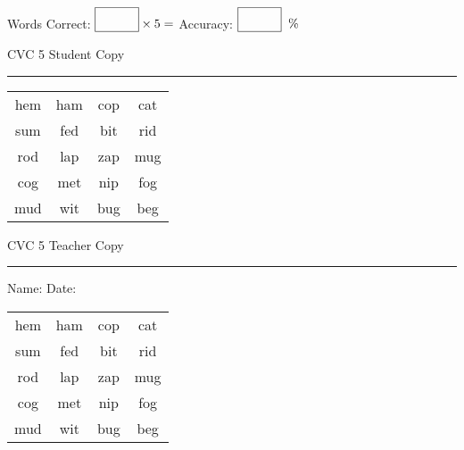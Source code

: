\documentclass{memoir}
\begin{document}
\small

Words Correct: $\fbox{\phantom{\huge 100}} \times 5 = $ Accuracy: $\fbox{\phantom{\huge 100}}\;\; \%$ 

\vfill

\newpage


\footnotesize \noindent
CVC 5 \hfill Student Copy
\smallskip
\hrule

\Large

\setlength{\tabcolsep}{14pt}
\def\arraystretch{2}

{\selectfont


\begin{vplace}[0.5]
\begin{center}
\begin{tabular}{cccc}
hem & ham & cop & cat \\
sum & fed & bit & rid \\
rod & lap & zap & mug \\
cog & met & nip & fog \\
mud & wit & bug & beg \\
\end{tabular}
\end{center}
\end{vplace}

}

\newpage

\footnotesize \noindent
CVC 5 \hfill Teacher Copy
\smallskip
\hrule

\small

\vfill

\noindent
Name: \underline{\hspace{1.75in}} \hfill Date: \underline{\hspace{1in}}

\Large

{\selectfont


\begin{vplace}[0.5]
\begin{center}
\begin{tabular}{cccc}
hem & ham & cop & cat \\
sum & fed & bit & rid \\
rod & lap & zap & mug \\
cog & met & nip & fog \\
mud & wit & bug & beg \\
\end{tabular}
\end{center}
\end{vplace}



}
\end{document}
